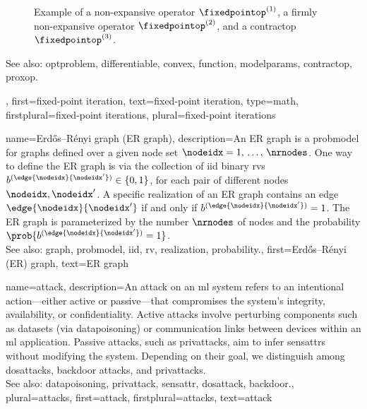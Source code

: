 {{\begin{figure}[H]
\begin{center}
			\end{center} 
			\caption{Example of a non-expansive operator $\fixedpointop^{(1)}$, a firmly non-expansive operator $\fixedpointop^{(2)}$, and 
				a \gls{contractop} $\fixedpointop^{(3)}$. \label{fig_examples_nonexp_dict}}
		\end{figure} 
		See also: \gls{optproblem}, \gls{differentiable}, \gls{convex}, \gls{function}, \glspl{modelparam}, \gls{contractop}, \gls{proxop}.},
	first={fixed-point iteration},
	text={fixed-point iteration},
	type=math, 
	firstplural={fixed-point iterations}, 
	plural={fixed-point iterations}
}


{name={Erd\H{o}s–R\'enyi graph (ER graph)},
	description={An ER \gls{graph} is a \gls{probmodel} for \glspl{graph} defined over 
		a given node set $\nodeidx=1, \,\ldots, \,\nrnodes$. One way to define the ER \gls{graph} is 
		via the collection of \gls{iid} binary \glspl{rv} $b^{(\edge{\nodeidx}{\nodeidx'})} \in \{0,1\}$, 
		for each pair of different nodes $\nodeidx, \nodeidx'$. A specific \gls{realization}  
		of an ER \gls{graph} contains an edge $\edge{\nodeidx}{\nodeidx'}$ if and only if 
		$b^{(\edge{\nodeidx}{\nodeidx'})}=1$. The ER \gls{graph} is parameterized by the 
		number $\nrnodes$ of nodes and the \gls{probability} $\prob{b^{(\edge{\nodeidx}{\nodeidx'})}=1}$. 
		\\
		See also: \gls{graph}, \gls{probmodel}, \gls{iid}, \gls{rv}, \gls{realization}, \gls{probability}.},
	first={Erd\H{o}s–R\'enyi (ER) graph},
	text={ER graph}
}

{name={attack},  
	description={An attack on an \gls{ml} system refers to an intentional action—either 
		active or passive—that compromises the system's integrity, availability, or confidentiality. 
		Active attacks involve perturbing components such as \glspl{dataset} (via \gls{datapoisoning}) 
		or communication links between \glspl{device} within an \gls{ml} application. Passive attacks, 
		such as \glspl{privattack}, aim to infer \glspl{sensattr} without modifying the system. 
		Depending on their goal, we distinguish among \glspl{dosattack}, \gls{backdoor} attacks, and \glspl{privattack}.
		\\
		See also: \gls{datapoisoning}, \gls{privattack}, \gls{sensattr}, \gls{dosattack}, \gls{backdoor}.},
	plural={attacks}, 
	first={attack},
	firstplural={attacks},
	text={attack}
}

